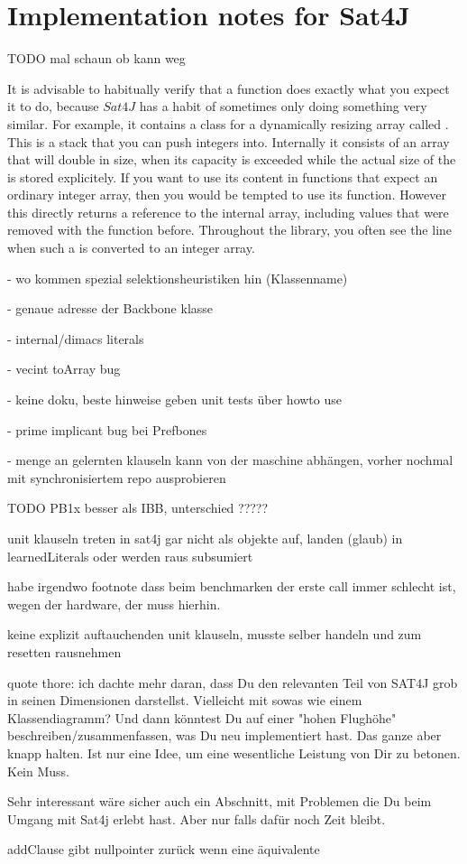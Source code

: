 \section{Implementation notes for Sat4J}




TODO mal schaun ob kann weg


It is advisable to habitually verify that a function does exactly what you expect it to do, because $Sat4J$ has a habit of sometimes only doing something very similar. For example, it contains a class for a dynamically resizing array called . This is a stack that you can push integers into. Internally it consists of an array that will double in size, when its capacity is exceeded while the actual size of the  is stored explicitely. If you want to use its content in functions that expect an ordinary integer array, then you would be tempted to use its  function. However this directly returns a reference to the internal array, including values that were removed with the  function before. Throughout the library, you often see the line  when such a  is converted to an integer array. 

- wo kommen spezial selektionsheuristiken hin (Klassenname)

- genaue adresse der Backbone klasse

- internal/dimacs literals

- vecint toArray bug

- keine doku, beste hinweise geben unit tests über howto use

- prime implicant bug bei Prefbones

- menge an gelernten klauseln kann von der maschine abhängen, vorher nochmal mit synchronisiertem repo ausprobieren

TODO PB1x besser als IBB, unterschied ?????

unit klauseln treten in sat4j gar nicht als objekte auf, landen (glaub) in learnedLiterals oder werden raus subsumiert

habe irgendwo footnote dass beim benchmarken der erste call immer schlecht ist, wegen der hardware, der muss hierhin.

keine explizit auftauchenden unit klauseln, musste selber handeln und zum resetten rausnehmen

quote thore: ich dachte mehr daran, dass Du den relevanten Teil von SAT4J grob in seinen Dimensionen darstellst. Vielleicht mit sowas wie einem Klassendiagramm? Und dann könntest Du auf einer "hohen Flughöhe" beschreiben/zusammenfassen, was Du neu implementiert hast. Das ganze aber knapp halten. Ist nur eine Idee, um eine wesentliche Leistung von Dir zu betonen. Kein Muss.

Sehr interessant wäre sicher auch ein Abschnitt, mit Problemen die Du beim Umgang mit Sat4j erlebt hast. Aber nur falls dafür noch Zeit bleibt. 


addClause gibt nullpointer zurück wenn eine äquivalente 
